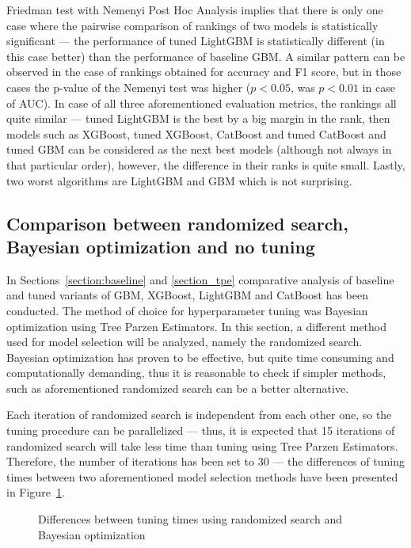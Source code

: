 \documentclass[magisterska, english]{pwr_wmat_praca_dyplomowa}
\theoremstyle{plain}
\numberwithin{theorem}{chapter}
\theoremstyle{definition}
\numberwithin{theorem}{chapter}
\newcommand{\gbm}{GBM, XGBoost, LightGBM and CatBoost }
\begin{document}
Friedman test with Nemenyi Post Hoc Analysis implies that there is only one case where the pairwise comparison of rankings of two models is statistically significant --- the performance of tuned LightGBM is statistically different (in this case better) than the performance of baseline GBM. A similar pattern can be observed in the case of rankings obtained for accuracy and F1 score, but in those cases the p-value of the Nemenyi test was higher ($p<0.05$, was $p<0.01$ in case of AUC). In case of all three aforementioned evaluation metrics, the rankings all quite similar --- tuned LightGBM is the best by a big margin in the rank, then models such as XGBoost, tuned XGBoost, CatBoost and tuned CatBoost and tuned GBM can be considered as the next best models (although not always in that particular order), however, the difference in their ranks is quite small. Lastly, two worst algorithms are LightGBM and GBM which is not surprising.   

\subsection{Comparison between randomized search, Bayesian optimization and no tuning}\label{section_rand}
In Sections~\ref{section:baseline} and \ref{section_tpe} comparative analysis of baseline and tuned variants of \gbm has been conducted. The method of choice for hyperparameter tuning was Bayesian optimization using Tree Parzen Estimators. In this section, a different method used for model selection will be analyzed, namely the randomized search. Bayesian optimization has proven to be effective, but quite time consuming and computationally demanding, thus it is reasonable to check if simpler methods, such as aforementioned randomized search can be a better alternative. 

Each iteration of randomized search is independent from each other one, so the tuning procedure can be parallelized --- thus, it is expected that 15 iterations of randomized search will take less time than tuning using Tree Parzen Estimators. Therefore, the number of iterations has been set to 30 --- the differences of tuning times between two aforementioned model selection methods have been presented in Figure~\ref{fig:diffs}.

\begin{figure}[H]
	\centering
	\caption{Differences between tuning times using randomized search and Bayesian optimization}
	\label{fig:diffs}
\end{figure}
\end{document}
